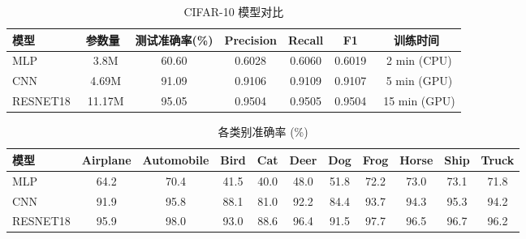 
\begin{table}[htbp]
  \centering
  \caption{CIFAR-10 模型对比}
  \label{tab:model_comparison}
  \begin{tabular}{lcccccc}
    \toprule
    模型 & 参数量 & 测试准确率(\%) & Precision & Recall & F1 & 训练时间 \\
    \midrule
    MLP & ~3.8M & 60.60 & 0.6028 & 0.6060 & 0.6019 & ~2 min (CPU) \\
    CNN & ~4.69M & 91.09 & 0.9106 & 0.9109 & 0.9107 & ~5 min (GPU) \\
    RESNET18 & ~11.17M & 95.05 & 0.9504 & 0.9505 & 0.9504 & ~15 min (GPU) \\
    \bottomrule
  \end{tabular}
\end{table}

\begin{table}[htbp]
  \centering
  \caption{各类别准确率 (\%)}
  \label{tab:per_class_accuracy}
  \begin{tabular}{lcccccccccc}
    \toprule
    模型 & Airplane & Automobile & Bird & Cat & Deer & Dog & Frog & Horse & Ship & Truck \\
    \midrule
    MLP & 64.2 & 70.4 & 41.5 & 40.0 & 48.0 & 51.8 & 72.2 & 73.0 & 73.1 & 71.8 \\
    CNN & 91.9 & 95.8 & 88.1 & 81.0 & 92.2 & 84.4 & 93.7 & 94.3 & 95.3 & 94.2 \\
    RESNET18 & 95.9 & 98.0 & 93.0 & 88.6 & 96.4 & 91.5 & 97.7 & 96.5 & 96.7 & 96.2 \\
    \bottomrule
  \end{tabular}
\end{table}
